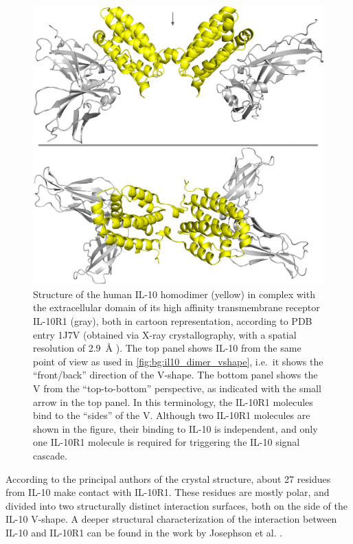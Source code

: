 \begin{figure}
\centering
\includegraphics[width=1.0\textwidth]{gfx/background/il10r1_il10_complex_topside_02.jpg}
\caption[]{
Structure of the human IL-10 homodimer (yellow) in complex with the
extracellular domain of its high affinity transmembrane receptor IL-10R1 (gray),
both in cartoon representation, according to PDB entry 1J7V (obtained via X-ray
crystallography, with a spatial resolution of \SI{2.9}{\angstrom}
\cite{Josephson2001}). The top panel shows IL-10 from the same point of view as
used in \cref{fig:bg:il10_dimer_vshape}, i.e.\ it shows the \enquote{front/back}
direction of the V-shape. The bottom panel shows the V from the
\enquote{top-to-bottom} perspective, as indicated with the small arrow in the
top panel. In this terminology, the IL-10R1 molecules bind to the
\enquote{sides} of the V. Although two IL-10R1 molecules are shown in the
figure, their binding to IL-10 is independent, and only one IL-10R1 molecule is
required for triggering the IL-10 signal cascade.}
\label{fig:bg:il10_il10r1_complex}
\end{figure}

According to the principal authors of the crystal structure, about 27 residues
from IL-10 make contact with IL-10R1. These residues are mostly polar, and
divided into two structurally distinct interaction surfaces, both on the side of
the IL-10 V-shape. A deeper structural characterization of the interaction
between IL-10 and IL-10R1 can be found in the work by Josephson et al.
\cite{Josephson2001}.


